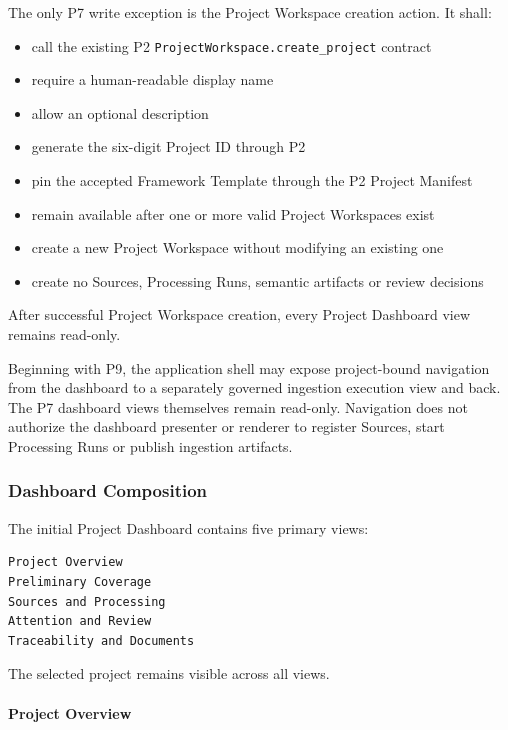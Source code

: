 The only P7 write exception is the Project Workspace creation action. It shall:

\begin{itemize}
\tightlist
\item
  call the existing P2 \texttt{ProjectWorkspace.create\_project} contract
\item
  require a human-readable display name
\item
  allow an optional description
\item
  generate the six-digit Project ID through P2
\item
  pin the accepted Framework Template through the P2 Project Manifest
\item
  remain available after one or more valid Project Workspaces exist
\item
  create a new Project Workspace without modifying an existing one
\item
  create no Sources, Processing Runs, semantic artifacts or review decisions
\end{itemize}

After successful Project Workspace creation, every Project Dashboard view remains read-only.

Beginning with P9, the application shell may expose project-bound navigation from the dashboard to a separately governed ingestion execution view and back. The P7 dashboard views themselves remain read-only. Navigation does not authorize the dashboard presenter or renderer to register Sources, start Processing Runs or publish ingestion artifacts.

\hypertarget{dashboard-composition}{%
\subsubsection{Dashboard Composition}\label{dashboard-composition}}

The initial Project Dashboard contains five primary views:

\begin{verbatim}
Project Overview
Preliminary Coverage
Sources and Processing
Attention and Review
Traceability and Documents
\end{verbatim}

The selected project remains visible across all views.

\hypertarget{project-overview}{%
\paragraph{Project Overview}\label{project-overview}}

